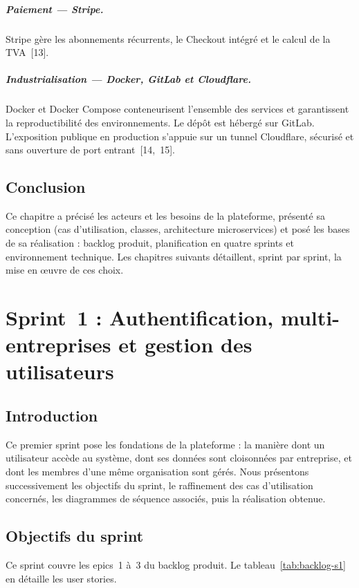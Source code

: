 \documentclass[12pt,a4paper,oneside]{report}
\begin{document}
\paragraph{Paiement — Stripe.}
Stripe gère les abonnements récurrents, le Checkout intégré et le calcul de
la TVA~[13].

\paragraph{Industrialisation — Docker, GitLab et Cloudflare.}
Docker et Docker Compose conteneurisent l'ensemble des services et
garantissent la reproductibilité des environnements. Le dépôt est hébergé
sur GitLab. L'exposition publique en production s'appuie sur un tunnel
Cloudflare, sécurisé et sans ouverture de port entrant~[14,~15].

\section*{Conclusion}
Ce chapitre a précisé les acteurs et les besoins de la plateforme, présenté
sa conception (cas d'utilisation, classes, architecture microservices) et
posé les bases de sa réalisation : backlog produit, planification en quatre
sprints et environnement technique. Les chapitres suivants détaillent, sprint
par sprint, la mise en \oe{}uvre de ces choix.

\chapter{Sprint~1 : Authentification, multi-entreprises et gestion des utilisateurs}
\label{chap:sprint1}

\section*{Introduction}
Ce premier sprint pose les fondations de la plateforme : la manière dont un
utilisateur accède au système, dont ses données sont cloisonnées par
entreprise, et dont les membres d'une même organisation sont gérés. Nous
présentons successivement les objectifs du sprint, le raffinement des cas
d'utilisation concernés, les diagrammes de séquence associés, puis la
réalisation obtenue.

\section{Objectifs du sprint}
Ce sprint couvre les epics~1 à~3 du backlog produit. Le
tableau~\ref{tab:backlog-s1} en détaille les user stories.
\end{document}
